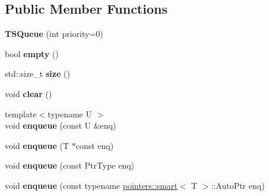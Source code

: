 \subsection*{Public Member Functions}
\begin{DoxyCompactItemize}
\item 
\hypertarget{classcore_1_1threading_1_1container_1_1_t_s_queue_ab5504b9501eb749cc80c96a8d8b3481e}{{\bfseries T\-S\-Queue} (int priority=0)}\label{classcore_1_1threading_1_1container_1_1_t_s_queue_ab5504b9501eb749cc80c96a8d8b3481e}

\item 
\hypertarget{classcore_1_1threading_1_1container_1_1_t_s_queue_ad0fe7ca1dc8dd016e1b097d40a51cbb7}{bool {\bfseries empty} ()}\label{classcore_1_1threading_1_1container_1_1_t_s_queue_ad0fe7ca1dc8dd016e1b097d40a51cbb7}

\item 
\hypertarget{classcore_1_1threading_1_1container_1_1_t_s_queue_a033ffccb76b077227082e35d1021ff71}{std\-::size\-\_\-t {\bfseries size} ()}\label{classcore_1_1threading_1_1container_1_1_t_s_queue_a033ffccb76b077227082e35d1021ff71}

\item 
\hypertarget{classcore_1_1threading_1_1container_1_1_t_s_queue_a07ab7ced09725a6c6dedc30b30f83b20}{void {\bfseries clear} ()}\label{classcore_1_1threading_1_1container_1_1_t_s_queue_a07ab7ced09725a6c6dedc30b30f83b20}

\item 
\hypertarget{classcore_1_1threading_1_1container_1_1_t_s_queue_a693fc7304a2958e5c2b7c652046a47cd}{{\footnotesize template$<$typename U $>$ }\\void {\bfseries enqueue} (const U \&enq)}\label{classcore_1_1threading_1_1container_1_1_t_s_queue_a693fc7304a2958e5c2b7c652046a47cd}

\item 
\hypertarget{classcore_1_1threading_1_1container_1_1_t_s_queue_ab231c649a378d6fb755e8dd2d5a72c84}{void {\bfseries enqueue} (T $\ast$const enq)}\label{classcore_1_1threading_1_1container_1_1_t_s_queue_ab231c649a378d6fb755e8dd2d5a72c84}

\item 
\hypertarget{classcore_1_1threading_1_1container_1_1_t_s_queue_a010e3bcb1f9f26716e2968154ffcdbb0}{void {\bfseries enqueue} (const Ptr\-Type enq)}\label{classcore_1_1threading_1_1container_1_1_t_s_queue_a010e3bcb1f9f26716e2968154ffcdbb0}

\item 
\hypertarget{classcore_1_1threading_1_1container_1_1_t_s_queue_a2b77ecb529eaa204a4d7b7b58821ed7b}{void {\bfseries enqueue} (const typename \hyperlink{structcore_1_1pointers_1_1smart}{pointers\-::smart}$<$ T $>$\-::Auto\-Ptr enq)}\label{classcore_1_1threading_1_1container_1_1_t_s_queue_a2b77ecb529eaa204a4d7b7b58821ed7b}


\end{DoxyCompactItemize}
